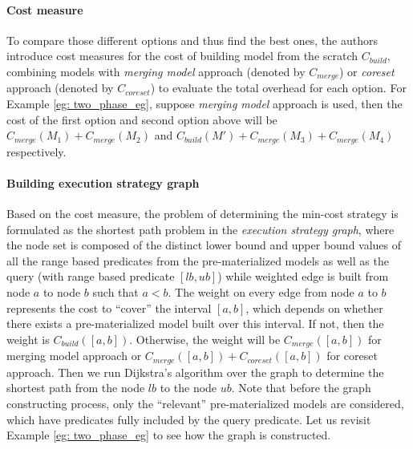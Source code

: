 \paragraph{Cost measure} To compare those different options and thus find the best ones, the authors introduce cost measures for the cost of building model from the scratch $C_{build}$, combining models with {\em merging model} approach (denoted by $C_{merge}$) or {\em coreset} approach (denoted by $C_{coreset}$) to evaluate the total overhead for each option. For Example \ref{eg: two_phase_eg}, suppose {\em merging model} approach is used, then the cost of the first option and second option above will be $C_{merge}(M_1) + C_{merge}(M_2)$ and $C_{build}(M') + C_{merge}(M_3) + C_{merge}(M_4)$ respectively. 

\paragraph{Building execution strategy graph} Based on the cost measure, the problem of determining the min-cost strategy is formulated as the shortest path problem in the {\em execution strategy graph}, where the node set is composed of the distinct lower bound and upper bound values of all the range based predicates from the pre-materialized models as well as the query (with range based predicate $[lb, ub]$) while weighted edge is built from node $a$ to node $b$ such that $a < b$. The weight on every edge from node $a$ to $b$ represents the cost to ``cover'' the interval $[a,b]$, which depends on whether there exists a pre-materialized model built over this interval. If not, then the weight is $C_{build}([a,b])$. Otherwise, the weight will be $C_{merge}([a,b])$ for merging model approach or $C_{merge}([a,b]) + C_{coreset}([a,b])$ for coreset approach. Then we run Dijkstra's algorithm over the graph to determine the shortest path from the node $lb$ to the node $ub$. Note that before the graph constructing process, only the ``relevant'' pre-materialized models are considered, which have predicates fully included by the query predicate. Let us revisit Example \ref{eg: two_phase_eg} to see how the graph is constructed.

